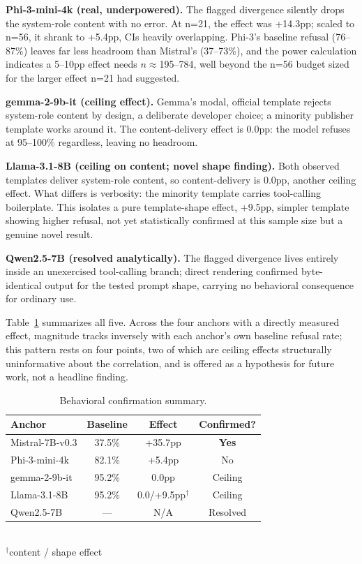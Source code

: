 \documentclass[letterpaper,twocolumn,10pt]{article}
\begin{document}
\textbf{Phi-3-mini-4k (real, underpowered).} The flagged divergence silently drops the system-role content with no error. At n=21, the effect was +14.3pp; scaled to n=56, it shrank to +5.4pp, CIs heavily overlapping. Phi-3's baseline refusal (76--87\%) leaves far less headroom than Mistral's (37--73\%), and the power calculation indicates a 5--10pp effect needs $n\approx$195--784, well beyond the n=56 budget sized for the larger effect n=21 had suggested.

\textbf{gemma-2-9b-it (ceiling effect).} Gemma's modal, official template rejects system-role content by design, a deliberate developer choice; a minority publisher template works around it. The content-delivery effect is 0.0pp: the model refuses at 95--100\% regardless, leaving no headroom.

\textbf{Llama-3.1-8B (ceiling on content; novel shape finding).} Both observed templates deliver system-role content, so content-delivery is 0.0pp, another ceiling effect. What differs is verbosity: the minority template carries tool-calling boilerplate. This isolates a pure template-shape effect, +9.5pp, simpler template showing higher refusal, not yet statistically confirmed at this sample size but a genuine novel result.

\textbf{Qwen2.5-7B (resolved analytically).} The flagged divergence lives entirely inside an unexercised tool-calling branch; direct rendering confirmed byte-identical output for the tested prompt shape, carrying no behavioral consequence for ordinary use.

Table~\ref{tab:behavioral} summarizes all five. Across the four anchors with a directly measured effect, magnitude tracks inversely with each anchor's own baseline refusal rate; this pattern rests on four points, two of which are ceiling effects structurally uninformative about the correlation, and is offered as a hypothesis for future work, not a headline finding.

\begin{table}[t]
\caption{Behavioral confirmation summary.}
\label{tab:behavioral}
\centering
\small
\begin{tabular}{lccc}
\toprule
Anchor & Baseline & Effect & Confirmed? \\
\midrule
Mistral-7B-v0.3 & 37.5\% & +35.7pp & \textbf{Yes} \\
Phi-3-mini-4k & 82.1\% & +5.4pp & No \\
gemma-2-9b-it & 95.2\% & 0.0pp & Ceiling \\
Llama-3.1-8B & 95.2\% & 0.0/+9.5pp$^\dagger$ & Ceiling \\
Qwen2.5-7B & --- & N/A & Resolved \\
\bottomrule
\end{tabular}
\\[2pt]
{\footnotesize $^\dagger$content / shape effect}
\end{table}
\end{document}
